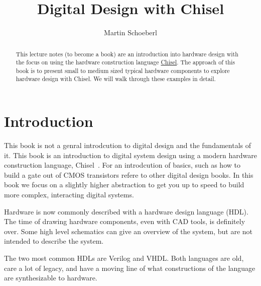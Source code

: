 \documentclass[a4paper]{article}
\begin{document}
\title{Digital Design with Chisel}

\author{Martin Schoeberl}




\maketitle \thispagestyle{empty}

\begin{abstract}
This lecture notes (to become a book) are an introduction into hardware design with the focus
on using the hardware construction language
\href{https://chisel.eecs.berkeley.edu/}{Chisel}. The approach of this book
is to present small to medium sized typical hardware components to explore
hardware design with Chisel.
We will walk through these examples in detail.
\end{abstract}


\section{Introduction}
\label{sec:intro}

This book is not a genral introdcution to digital design and the fundamentals
of it.
This book is an introduction to digital system design using a modern hardware
construction language, Chisel~\cite{chisel:dac2012}.
For an introdcution of basics, such as how to build a gate out of CMOS transistors
refere to other digital design books.
In this book we focus on a slightly higher abstraction to get you up to
speed to build more complex, interacting digital systems.

Hardware is now commonly described with a hardware design language (HDL).
The time of drawing hardware components, even with CAD tools, is definitely
over. Some high level schematics can give an overview of the system, but are
not intended to describe the system.

The two most common HDLs are Verilog and VHDL. Both languages are old,
care a lot of legacy, and have a moving line of what constructions of the language
are synthesizable to hardware.
\end{document}
